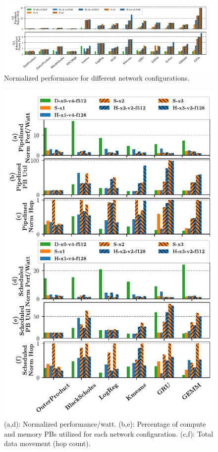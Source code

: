 \begin{figure}
\centering
\includegraphics[width=1\linewidth]{figs/perf.pdf}
  \caption{Normalized performance for different network configurations.}\label{fig:perf}
\end{figure}

\begin{figure}
\centering
  \includegraphics[width=1\columnwidth]{figs/energy.pdf} 
\caption{(a,d): Normalized performance/watt. (b,e): Percentage of compute and memory PBs utilized for each network configuration. 
  (c,f): Total data movement (hop count).}
\label{fig:energy}
\end{figure}

